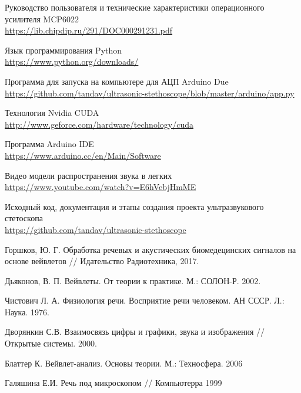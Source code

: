 \documentclass[../main.tex]{subfiles}
\begin{document}
\begin{thebibliography}{}
Руководство пользователя и технические характеристики операционного усилителя MCP6022\\
\url{https://lib.chipdip.ru/291/DOC000291231.pdf}

Язык программирования Python\\
\url{https://www.python.org/downloads/}

Программа для запуска на компьютере для АЦП Arduino Due\\
\url{https://github.com/tandav/ultrasonic-stethoscope/blob/master/arduino/app.py}

Технология Nvidia CUDA\\
\url{http://www.geforce.com/hardware/technology/cuda}

Программа Arduino IDE\\
\url{https://www.arduino.cc/en/Main/Software}

Видео модели распространения звука в легких\\
\url{https://www.youtube.com/watch?v=E6hVebjHmME}

Исходный код, документация и этапы создания проекта ультразвукового стетоскопа\\
\url{https://github.com/tandav/ultrasonic-stethoscope}

Горшков, Ю. Г. Обработка речевых и акустических биомедецинских сигналов на основе вейвлетов // Идательство Радиотехника, 2017.

Дьяконов, В. П. Вейвлеты. От теории к практике. М.: СОЛОН-Р. 2002.

Чистович Л. А. Физиология речи. Восприятие речи человеком. АН СССР. Л.: Наука. 1976.

Дворянкин С.В. Взаимосвязь цифры и графики, звука и изображения // Открытые системы. 2000.

Блаттер К. Вейвлет-анализ. Основы теории. М.: Техносфера. 2006

Галяшина Е.И. Речь под микроскопом // Компьютерра 1999

\end{thebibliography}
\end{document}
